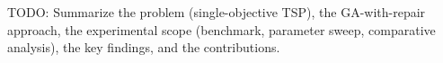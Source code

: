 TODO: Summarize the problem (single-objective TSP), the GA-with-repair approach, the experimental scope (benchmark, parameter sweep, comparative analysis), the key findings, and the contributions.
